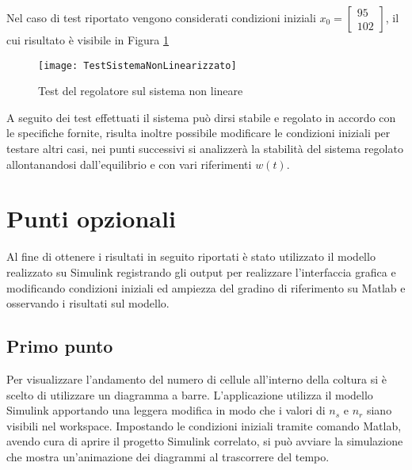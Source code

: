 \documentclass[a4paper, 11pt]{article}
\begin{document}
Nel caso di test riportato vengono considerati condizioni iniziali $x_0=\begin{bmatrix}
	95
	\\
	102
\end{bmatrix}$, il cui risultato è visibile in Figura \ref{Figura 11}
\begin{figure}[H]
	\centering
	\texttt{[image: TestSistemaNonLinearizzato]}
	\caption[]{Test del regolatore sul sistema non lineare}
	\label{Figura 11}
\end{figure}

A seguito dei test effettuati il sistema può dirsi stabile e regolato in accordo con le specifiche fornite, risulta inoltre possibile modificare le condizioni iniziali per testare altri casi, nei punti successivi si analizzerà la stabilità del sistema regolato allontanandosi dall'equilibrio e con vari riferimenti $w(t)$.
\section{Punti opzionali}
Al fine di ottenere i risultati in seguito riportati è stato utilizzato il modello realizzato su Simulink registrando gli output per realizzare l'interfaccia grafica e modificando condizioni iniziali ed ampiezza del gradino di riferimento su Matlab e osservando i risultati sul modello.

\subsection{Primo punto}

Per visualizzare l'andamento del numero di cellule all'interno della coltura si è scelto di utilizzare un diagramma a barre. L'applicazione utilizza il modello Simulink apportando una leggera modifica in modo che i valori di $n_s$ e $n_r$ siano visibili nel workspace. Impostando le condizioni iniziali tramite comando Matlab, avendo cura di aprire il progetto Simulink correlato, si può avviare la simulazione che mostra un'animazione dei diagrammi al trascorrere del tempo.
\end{document}
